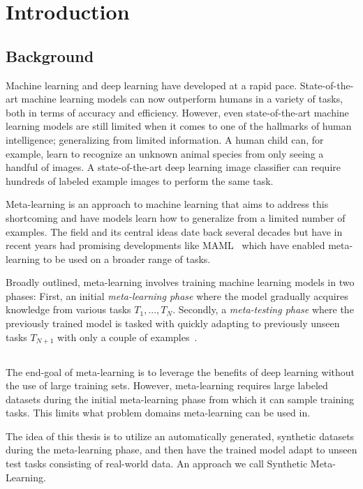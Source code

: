 \chapter{Introduction}
\section{Background}
Machine learning and deep learning have developed at a rapid pace. State-of-the-art machine learning models can now outperform humans in a variety of tasks, both in terms of accuracy and efficiency. However, even state-of-the-art machine learning models are still limited when it comes to one of the hallmarks of human intelligence; generalizing from limited information. A human child can, for example, learn to recognize an unknown animal species from only seeing a handful of images. A state-of-the-art deep learning image classifier can require hundreds of labeled example images to perform the same task.

Meta-learning is an approach to machine learning that aims to address this shortcoming and have models learn how to generalize from a limited number of examples. The field and its central ideas date back several decades but have in recent years had promising developments like \gls{MAML}~\cite{maml} which have enabled meta-learning to be used on a broader range of tasks. 

Broadly outlined, meta-learning involves training machine learning models in two phases: First, an initial \textit{meta-learning phase} where the model gradually acquires knowledge from various tasks $T_1, ..., T_N$. Secondly, a \textit{meta-testing phase} where the previously trained model is tasked with quickly adapting to previously unseen tasks $T_{N+1}$ with only a couple of examples~\cite{reptile}.

\section{}
The end-goal of meta-learning is to leverage the benefits of deep learning without the use of large training sets. However, meta-learning requires large labeled datasets during the initial meta-learning phase from which it can sample training tasks. This limits what problem domains meta-learning can be used in.

The idea of this thesis is to utilize an automatically generated, synthetic datasets during the meta-learning phase, and then have the trained model adapt to unseen test tasks consisting of real-world data. An approach we call Synthetic Meta-Learning.

